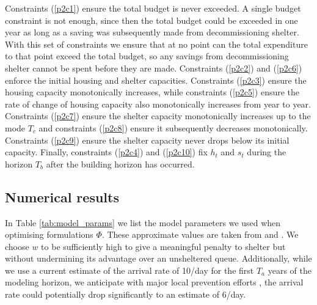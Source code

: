 \documentclass[12pt,a4paper]{article}
\begin{document}
Constraints (\ref{p2c1}) ensure the total budget is never exceeded. A single budget constraint is not enough, since then the total budget could be exceeded in one year as long as a saving was subsequently made from decommissioning shelter. With this set of constraints we ensure that at no point can the total expenditure to that point exceed the total budget, so any savings from decommissioning shelter cannot be spent before they are made. Constraints (\ref{p2c2}) and (\ref{p2c6}) enforce the initial housing and shelter capacities. Constraints (\ref{p2c3}) ensure the housing capacity monotonically increases, while constraints (\ref{p2c5}) ensure the rate of change of housing capacity also monotonically increases from year to year. Constraints (\ref{p2c7}) ensure the shelter capacity monotonically increases up to the mode $T_c$ and constraints (\ref{p2c8}) ensure it subsequently decreases monotonically. Constraints (\ref{p2c9}) ensure the shelter capacity never drops below its initial capacity. Finally, constraints (\ref{p2c4}) and (\ref{p2c10}) fix $h_t$ and $s_t$ during the horizon $T_b$ after the building horizon has occurred.
%
\subsection{Numerical results} \label{results}

In Table \ref{tab:model_params} we list the model parameters we used when optimising formulations $\Phi$. These approximate values are taken from \cite{hometogether2022} and \cite{singham2023discrete}. We choose $w$ to be sufficiently high to give a meaningful penalty to shelter but without undermining its advantage over an unsheltered queue. Additionally, while we use a current estimate of the arrival rate of 10/day for the first $T_a$ years of the modeling horizon, we anticipate with major local prevention efforts \citep{RICActionPlan}, the arrival rate could potentially drop significantly to an estimate of 6/day.
\end{document}
